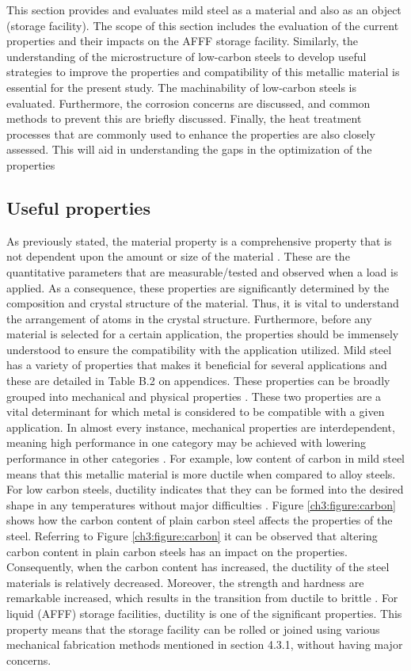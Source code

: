 This section provides and evaluates mild steel as a material and also as an object (storage facility). The scope of this section includes the evaluation of the current properties and their impacts on the AFFF storage facility. Similarly, the understanding of the microstructure of low-carbon steels to develop useful strategies to improve the properties and compatibility of this metallic material is essential for the present study. The machinability of low-carbon steels is evaluated. Furthermore, the corrosion concerns are discussed, and common methods to prevent this are briefly discussed. Finally, the heat treatment processes that are commonly used to enhance the properties are also closely assessed. This will aid in understanding the gaps in the optimization of the properties

\subsection{Useful properties} 
As previously stated, the material property is a comprehensive property that is not dependent upon the amount or size of the material \cite{kabir2020critical}. These are the quantitative parameters that are measurable/tested and observed when a load is applied. As a consequence, these properties are significantly determined by the composition and crystal structure of the material. Thus, it is vital to understand the arrangement of atoms in the crystal structure. Furthermore, before any material is selected for a certain application, the properties should be immensely understood to ensure the compatibility with the application utilized.
Mild steel has a variety of properties that makes it beneficial for several applications and these are detailed in Table B.2 on appendices. These properties can be broadly grouped into mechanical and physical properties \cite{kabir2020critical}. These two properties are a vital determinant for which metal is considered to be compatible with a given application. In almost every instance, mechanical properties are interdependent, meaning high performance in one category may be achieved with lowering performance in other categories \cite{kabir2020critical}. For example, low content of carbon in mild steel means that this metallic material is more ductile when compared to alloy steels. 
For low carbon steels, ductility indicates that they can be formed into the desired shape in any temperatures without major difficulties \cite{dong2005deformation}. Figure \ref{ch3:figure:carbon} shows how the carbon content of plain carbon steel affects the properties of the steel. Referring to Figure \ref{ch3:figure:carbon} it can be observed that altering carbon content in plain carbon steels has an impact on the properties. Consequently, when the carbon content has increased, the ductility of the steel materials is relatively decreased. Moreover, the strength and hardness are remarkable increased, which results in the transition from ductile to brittle \cite{abou2001mechanical}. For liquid (AFFF) storage facilities, ductility is one of the significant properties. This property means that the storage facility can be rolled or joined using various mechanical fabrication methods mentioned in section 4.3.1, without having major concerns.
 
